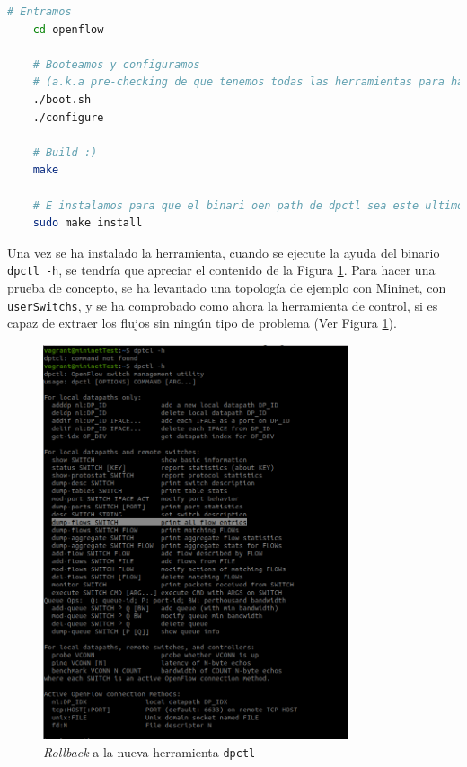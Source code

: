 \begin{lstlisting}[language= bash, style=Consola, caption={Construcción de la nueva versión de dpctl},label=code:dpctlold2]
    # Entramos
    cd openflow

    # Booteamos y configuramos 
    # (a.k.a pre-checking de que tenemos todas las herramientas para hacer el make)
    ./boot.sh
    ./configure

    # Build :)
    make

    # E instalamos para que el binari oen path de dpctl sea este ultimo
    sudo make install
\end{lstlisting}
\vspace{0.5cm}


Una vez se ha instalado la herramienta, cuando se ejecute la ayuda del binario \texttt{dpctl -h}, se tendría que apreciar el contenido de la Figura \ref{fig:dpctl_5}. Para hacer una prueba de concepto, se ha levantado una topología de ejemplo con Mininet, con \texttt{userSwitchs}, y se ha comprobado como ahora la herramienta de control, si es capaz de extraer los flujos sin ningún tipo de problema (Ver Figura \ref{fig:dpctl_5}).
\newpage

\begin{figure}[ht!]
    \centering
    \includegraphics[width=0.8\textwidth]{archivos/img/dev/dpctl_5.png}
    \caption{\textit{Rollback} a la nueva herramienta \texttt{dpctl}}
    \label{fig:dpctl_5}
\end{figure}

